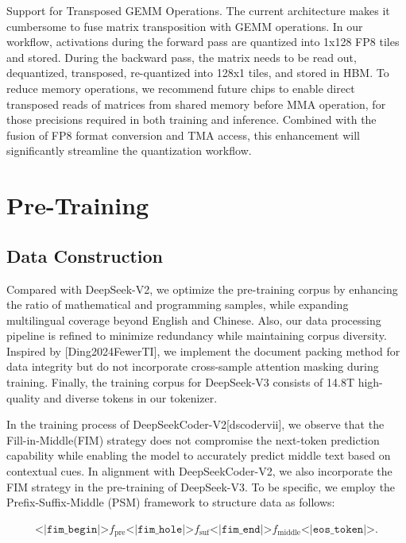 \documentclass[11pt,a4paper]{article}
\begin{document}
Support for Transposed GEMM Operations. The current architecture makes it cumbersome to fuse matrix transposition with GEMM operations. In our workflow, activations during the forward pass are quantized into 1x128 FP8 tiles and stored. During the backward pass, the matrix needs to be read out, dequantized, transposed, re-quantized into 128x1 tiles, and stored in HBM. To reduce memory operations, we recommend future chips to enable direct transposed reads of matrices from shared memory before MMA operation, for those precisions required in both training and inference. Combined with the fusion of FP8 format conversion and TMA access, this enhancement will significantly streamline the quantization workflow.

\section{Pre-Training}

\subsection{Data Construction}

Compared with DeepSeek-V2, we optimize the pre-training corpus by enhancing the ratio of mathematical and programming samples, while expanding multilingual coverage beyond English and Chinese. Also, our data processing pipeline is refined to minimize redundancy while maintaining corpus diversity. Inspired by [Ding2024FewerTI], we implement the document packing method for data integrity but do not incorporate cross-sample attention masking during training. Finally, the training corpus for DeepSeek-V3 consists of 14.8T high-quality and diverse tokens in our tokenizer.

In the training process of DeepSeekCoder-V2[dscodervii], we observe that the Fill-in-Middle(FIM) strategy does not compromise the next-token prediction capability while enabling the model to accurately predict middle text based on contextual cues. In alignment with DeepSeekCoder-V2, we also incorporate the FIM strategy in the pre-training of DeepSeek-V3. To be specific, we employ the Prefix-Suffix-Middle (PSM) framework to structure data as follows:

$$\begin{align}
\texttt{<|fim\_begin|>}f_{\text{pre}}\texttt{<|fim\_hole|>}f_{\text{suf}}\texttt{<|fim\_end|>}f_{\text{middle}}\texttt{<|eos\_token|>} . \nonumber
\end{align}$$
\end{document}
